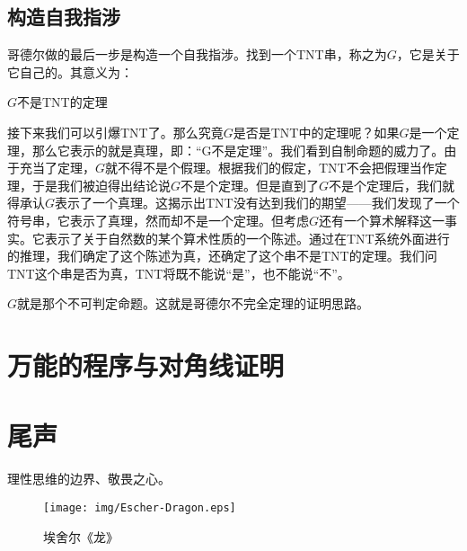 \documentclass{article}
\begin{document}
\subsection{构造自我指涉}

哥德尔做的最后一步是构造一个自我指涉。找到一个TNT串，称之为$G$，它是关于它自己的。其意义为：

\begin{center}
$G$不是TNT的定理
\end{center}

接下来我们可以引爆TNT了。那么究竟$G$是否是TNT中的定理呢？如果$G$是一个定理，那么它表示的就是真理，即：“G不是定理”。我们看到自制命题的威力了。由于充当了定理，$G$就不得不是个假理。根据我们的假定，TNT不会把假理当作定理，于是我们被迫得出结论说$G$不是个定理。但是直到了$G$不是个定理后，我们就得承认$G$表示了一个真理。这揭示出TNT没有达到我们的期望——我们发现了一个符号串，它表示了真理，然而却不是一个定理。但考虑$G$还有一个算术解释这一事实。它表示了关于自然数的某个算术性质的一个陈述。通过在TNT系统外面进行的推理，我们确定了这个陈述为真，还确定了这个串不是TNT的定理。我们问TNT这个串是否为真，TNT将既不能说“是”，也不能说“不”。

$G$就是那个不可判定命题。这就是哥德尔不完全定理的证明思路。

\section{万能的程序与对角线证明}

\section{尾声}
理性思维的边界、敬畏之心。

\begin{wrapfigure}{R}{0.5\textwidth}
 \centering
 \texttt{[image: img/Escher-Dragon.eps]}
 \caption{埃舍尔《龙》}
 \label{fig:Escher-Dragon}
\end{wrapfigure}
\end{document}
